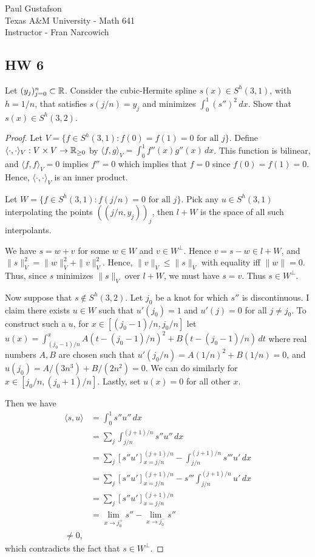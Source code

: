 \documentclass{article}
\begin{document}
\noindent Paul Gustafson\\
\noindent Texas A\&M University - Math 641\\ 
\noindent Instructor - Fran Narcowich

\subsection*{HW 6}
 Let $(y_j)_{j=0}^n \subset \mathbb{R}$. Consider the cubic-Hermite spline $s(x) \in S^h(3,1)$, with $h = 1/n$, that satisfies $s(j/n) = y_j$ and minimizes $\int_0^1 (s'')^2 \, dx$. Show that $s(x) \in S^h(3,2)$.
\begin{proof}
Let $V = \{f \in S^h(3,1) : f(0) = f(1) = 0 \text{ for all } j\}$.  Define $\langle \cdot, \cdot \rangle_V : V \times V \to \mathbb{R}_{\ge 0}$ by $\langle f, g \rangle_V = \int_0^1 f''(x) g''(x) \, dx$.  This function is bilinear, and $\langle f, f \rangle_V = 0$ implies $f'' = 0$ which implies that $f = 0$ since $f(0) = f(1) = 0$. Hence, $\langle \cdot, \cdot \rangle_V$ is an inner product.

Let $W = \{f \in S^h(3,1) : f(j/n) = 0 \text{ for all } j\}$.  Pick any $u \in S^h(3,1)$ interpolating the points $((j/n, y_j))_j$, then $l + W$ is the space of all such interpolants. 

We have $s = w + v$ for some $w \in W$ and $v \in W^\perp$.   Hence $v = s - w \in l + W$, and $\|s\|_V^2 = \|w\|_V^2 + \|v\|_V^2$.  Hence, $\|v\|_V \le \|s\|_V$ with equality iff $\|w\| = 0$.  Thus, since $s$ minimizes $\|s\|_V$ over $l + W$, we must have $s = v$.  Thus $s \in W^\perp$.

Now suppose that $s \not \in S^h(3,2)$. Let $j_0$ be a knot for which $s''$ is discontinuous.  I claim there exists $u \in W$ such that $u'(j_0) = 1$ and $u'(j) = 0$ for all $j \neq j_0$.  To construct such a $u$, for $x \in [(j_0-1)/n, j_0/n]$ let 
 $u(x) = \int_{(j_0-1)/n}^{x} A(t-(j_0-1)/n)^2 + B(t -(j_0 -1)/n) \, dt$ 
where real numbers $A, B$ are chosen such that $u'(j_0/n) = A(1/n)^2 + B(1/n) = 0$, and $u(j_0) = A/(3n^3) + B/(2n^2) = 0$.  We can do similarly for $x \in [j_0/n, (j_0+1)/n]$.  Lastly, set $u(x) = 0$ for all other $x$. 

Then we have 
\begin{align*}
\langle s, u \rangle & = \int_0^1 s'' u'' \, dx
\\ & = \sum_j \int_{j/n}^{(j+1)/n} s'' u'' \, dx
\\ & = \sum_j [s'' u']_{x=j/n}^{(j+1)/n} - \int_{j/n}^{(j+1)/n} s''' u' \, dx
\\ & = \sum_j [s'' u']_{x=j/n}^{(j+1)/n} -  s''' \int_{j/n}^{(j+1)/n}  u' \, dx
\\ & = \sum_j [s'' u']_{x=j/n}^{(j+1)/n} 
\\ & = \lim_{x \to j_0^+} s'' - \lim_{x \to j_0^-} s''
\\ \neq 0,
\end{align*}
which contradicts the fact that $s \in W^\perp$. 
\end{proof}
\end{document}
